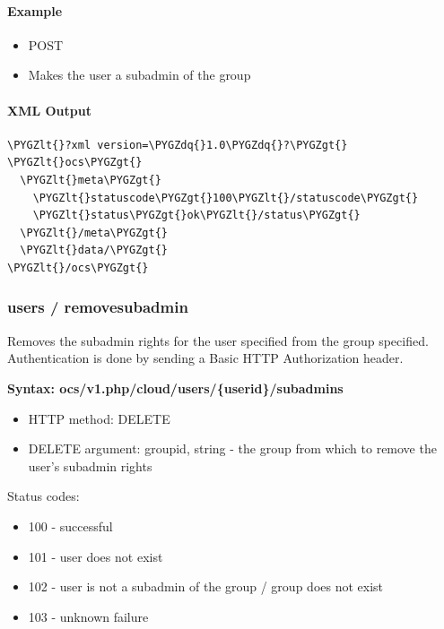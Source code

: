 \documentclass[letterpaper,10pt,english]{sphinxmanual}
\def\PYGZlt{\char`\<}
\def\PYGZgt{\char`\>}
\def\PYGZdq{\char`\"}
\begin{document}
\paragraph{Example}
\label{configuration_user/user_provisioning_api:id14}\begin{itemize}
\item {} 
POST

\item {} 
Makes the user  a subadmin of the  group

\end{itemize}


\paragraph{XML Output}
\label{configuration_user/user_provisioning_api:id15}
\begin{Verbatim}[commandchars=\\\{\}]
\PYGZlt{}?xml version=\PYGZdq{}1.0\PYGZdq{}?\PYGZgt{}
\PYGZlt{}ocs\PYGZgt{}
  \PYGZlt{}meta\PYGZgt{}
    \PYGZlt{}statuscode\PYGZgt{}100\PYGZlt{}/statuscode\PYGZgt{}
    \PYGZlt{}status\PYGZgt{}ok\PYGZlt{}/status\PYGZgt{}
  \PYGZlt{}/meta\PYGZgt{}
  \PYGZlt{}data/\PYGZgt{}
\PYGZlt{}/ocs\PYGZgt{}
\end{Verbatim}


\subsubsection{\textbf{users / removesubadmin}}
\label{configuration_user/user_provisioning_api:users-removesubadmin}
Removes the subadmin rights for the user specified from the group specified.
Authentication is done by sending a Basic HTTP Authorization header.

\textbf{Syntax: ocs/v1.php/cloud/users/\{userid\}/subadmins}
\begin{itemize}
\item {} 
HTTP method: DELETE

\item {} 
DELETE argument: groupid, string - the group from which to remove the user's
subadmin rights

\end{itemize}

Status codes:
\begin{itemize}
\item {} 
100 - successful

\item {} 
101 - user does not exist

\item {} 
102 - user is not a subadmin of the group / group does not exist

\item {} 
103 - unknown failure

\end{itemize}
\end{document}

